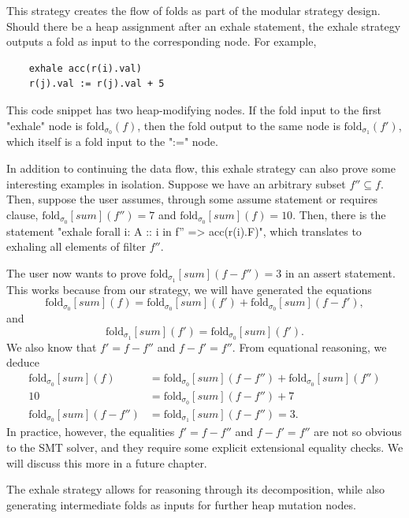 \documentclass[msc,oneside]{ubcthesis}
\begin{document}
This strategy creates the flow of folds as part of the modular strategy design. Should there be a heap assignment after an exhale statement, the exhale strategy outputs a fold as input to the corresponding node. For example,
\begin{lstlisting}
    exhale acc(r(i).val)
    r(j).val := r(j).val + 5
\end{lstlisting}
This code snippet has two heap-modifying nodes. If the fold input to the first "exhale" node is $\textrm{fold}_{\sigma_0}(f)$, then the fold output to the same node is $\textrm{fold}_{\sigma_1}(f')$, which itself is a fold input to the ":=" node.

In addition to continuing the data flow, this exhale strategy can also prove some interesting examples in isolation. Suppose we have an arbitrary subset $f'' \subseteq f$. Then, suppose the user assumes, through some assume statement or requires clause, $\textrm{fold}_{\sigma_0}[\textit{sum}](f'') = 7$ and $\textrm{fold}_{\sigma_0}[\textit{sum}](f) = 10$. Then, there is the statement 
"exhale forall i: A :: i in f'' => acc(r(i).F)", which translates to exhaling all elements of filter $f''$. 

The user now wants to prove $\textrm{fold}_{\sigma_1}[\textit{sum}](f - f'') = 3$ in an assert statement. This works because from our strategy, we will have generated the equations
$$\textrm{fold}_{\sigma_0}[\textit{sum}](f) = \textrm{fold}_{\sigma_0}[\textit{sum}](f') + \textrm{fold}_{\sigma_0}[\textit{sum}](f - f'), $$ and
$$\textrm{fold}_{\sigma_1}[\textit{sum}](f') = \textrm{fold}_{\sigma_0}[\textit{sum}](f'). $$
We also know that $f' = f - f''$ and $f - f' = f''$. From equational reasoning, we deduce
\begin{align*} 
\textrm{fold}_{\sigma_0}[\textit{sum}](f) &= \textrm{fold}_{\sigma_0}[\textit{sum}](f - f'') + \textrm{fold}_{\sigma_0}[\textit{sum}](f'') \\
10 &= \textrm{fold}_{\sigma_0}[\textit{sum}](f - f'') + 7 \\
\textrm{fold}_{\sigma_0}[\textit{sum}](f - f'') &= \textrm{fold}_{\sigma_1}[\textit{sum}](f - f'') = 3. 
\end{align*}
In practice, however, the equalities $f' = f - f''$ and $f - f' = f''$ are not so obvious to the SMT solver, and they require some explicit extensional equality checks. We will discuss this more in a future chapter.

The exhale strategy allows for reasoning through its decomposition, while also generating intermediate folds as inputs for further heap mutation nodes.
\end{document}

